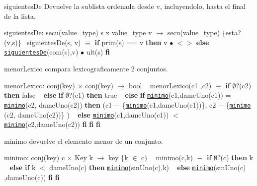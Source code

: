 \begin{DoxyParagraph}{siguientes\+De}
Devuelve la sublista ordenada desde v, incluyendolo, hasta el final de la lista.

siguientes\+De\+: secu(value\+\_\+type) s x value\+\_\+type v $\to$ secu(value\+\_\+type) \{esta?(v,s)\}~\newline
 siguientes\+De(s, v) $\equiv$ {\bfseries if} prim(s) == v {\bfseries then} v $\bullet$ $<$$>$ {\bfseries else} \href{axiomas.html#siguientesDe}{\tt siguientes\+De}(com(s),v) $\bullet$ ult(s) {\bfseries fi} 
\end{DoxyParagraph}


\begin{DoxyParagraph}{menor\+Lexico}
compara lexicograficamente 2 conjuntos.

menor\+Lexico\+: conj(key) $\times$ conj(key) $\to$ bool ~\newline
 menor\+Lexico(c1 ,c2) $\equiv$ {\bfseries if} $\emptyset$?(c2) {\bfseries then} false ~\newline
 {\bfseries else} {\bfseries if} $\emptyset$?(c1) {\bfseries then} true ~\newline
 {\bfseries else} {\bfseries if} \href{axiomas.html#minimo}{\tt minimo}(c1,dame\+Uno(c1)) = \href{axiomas.html#minimo}{\tt minimo}(c2, dame\+Uno(c2)) {\bfseries then} (c1 $-$ \{\href{axiomas.html#minimo}{\tt minimo}(c1,dame\+Uno(c1))\}, c2 $-$ \{\href{axiomas.html#minimo}{\tt minimo} (c2, dame\+Uno(c2))\} ) ~\newline
 {\bfseries else} \href{axiomas.html#minimo}{\tt minimo}(c1,dame\+Uno(c1)) $<$ \href{axiomas.html#minimo}{\tt minimo}(c2,dame\+Uno(c2)) {\bfseries fi} {\bfseries fi} {\bfseries fi} 
\end{DoxyParagraph}


\begin{DoxyParagraph}{minimo}
devuelve el elemento menor de un conjunto.

minimo\+: conj(key) c $\times$ Key k $\to$ key \{k $\in$ c\} ~\newline
 minimo(c,k) $\equiv$ {\bfseries if} $\emptyset$?(c) {\bfseries then} k ~\newline
 {\bfseries else} {\bfseries if} k $<$ dame\+Uno(c) {\bfseries then} \href{axiomas.html#minimo}{\tt minimo}(sin\+Uno(c),k) ~\newline
 {\bfseries else} \href{axiomas.html#minimo}{\tt minimo}(sin\+Uno(c) ,dame\+Uno(c)) {\bfseries fi} {\bfseries fi} 
\end{DoxyParagraph}


